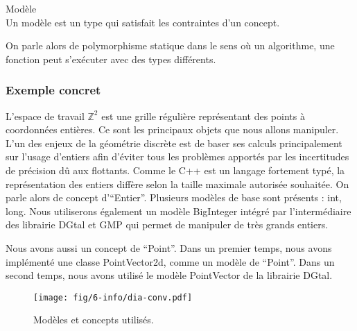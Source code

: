 \begin{Definition}{Modèle}\\
  Un modèle est un type qui satisfait les contraintes d'un concept.
\label{def:cpp-mod}

\end{Definition}

On parle alors de polymorphisme statique dans le sens où un algorithme, une fonction peut s'exécuter avec des types différents.

\subsubsection{Exemple concret}


L'espace de travail $\mathbb{Z}^{2}$ est une grille régulière représentant des points à coordonnées entières. Ce sont les principaux objets que nous allons manipuler. L'un des enjeux de la géométrie discrète est de baser ses calculs principalement sur l'usage d'entiers afin d'éviter tous les problèmes apportés par les incertitudes de précision dû aux flottants. Comme le C++ est un langage fortement typé, la représentation des entiers diffère selon la taille maximale autorisée souhaitée. On parle alors de concept d'``Entier''. Plusieurs modèles de base sont présents : int, long. Nous utiliserons également un modèle BigInteger intégré par l'intermédiaire des librairie DGtal et GMP qui permet de manipuler de très grands entiers.

Nous avons aussi un concept de ``Point''. Dans un premier temps, nous avons implémenté une classe PointVector2d, comme un modèle de ``Point''. Dans un second temps, nous avons utilisé le modèle PointVector de la librairie DGtal.  

\begin{figure}[H]
  \centering
  \texttt{[image: fig/6-info/dia-conv.pdf]}
  \caption{Modèles et concepts utilisés.}
\end{figure}


